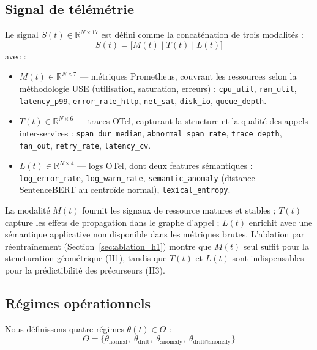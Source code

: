 \subsection{Signal de télémétrie}
\label{sec:signal}

Le signal $S(t) \in \mathbb{R}^{N \times 17}$ est défini comme la concaténation de
trois modalités :
\[
  S(t) = \bigl[M(t) \mid T(t) \mid L(t)\bigr]
\]
avec :
\begin{itemize}
  \item $M(t) \in \mathbb{R}^{N \times 7}$ --- métriques Prometheus, couvrant les ressources
    selon la méthodologie USE \cite{gregg2013} (utilisation, saturation, erreurs) :
    \texttt{cpu\_util}, \texttt{ram\_util}, \texttt{latency\_p99},
    \texttt{error\_rate\_http}, \texttt{net\_sat}, \texttt{disk\_io},
    \texttt{queue\_depth}.
  \item $T(t) \in \mathbb{R}^{N \times 6}$ --- traces OTel, capturant la structure et
    la qualité des appels inter-services :
    \texttt{span\_dur\_median}, \texttt{abnormal\_span\_rate}, \texttt{trace\_depth},
    \texttt{fan\_out}, \texttt{retry\_rate}, \texttt{latency\_cv}.
  \item $L(t) \in \mathbb{R}^{N \times 4}$ --- logs OTel, dont deux features sémantiques :
    \texttt{log\_error\_rate}, \texttt{log\_warn\_rate},
    \texttt{semantic\_anomaly} (distance SentenceBERT au centroïde normal),
    \texttt{lexical\_entropy}.
\end{itemize}

La modalité $M(t)$ fournit les signaux de ressource matures et stables ; $T(t)$ capture
les effets de propagation dans le graphe d'appel ; $L(t)$ enrichit avec une sémantique
applicative non disponible dans les métriques brutes.
L'ablation par réentraînement (Section~\ref{sec:ablation_h1}) montre que $M(t)$ seul suffit
pour la structuration géométrique (H1), tandis que $T(t)$ et $L(t)$ sont indispensables
pour la prédictibilité des précurseurs (H3).

\subsection{Régimes opérationnels}
\label{sec:regimes}

Nous définissons quatre régimes $\theta(t) \in \Theta$ :
\[
  \Theta = \{\theta_\text{normal},\; \theta_\text{drift},\;
             \theta_\text{anomaly},\; \theta_{\text{drift} \cap \text{anomaly}}\}
\]


